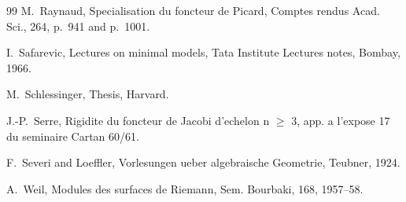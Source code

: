 \documentclass[10pt]{amsart}
\theoremstyle{plain}
\theoremstyle{definition}
\begin{document}
\begin{thebibliography}{99}
 M.~Raynaud, Specialisation du foncteur de Picard, Comptes rendus Acad. Sci., 264, p.~941 and p.~1001.

 I.~Safarevic, Lectures on minimal models, Tata Institute Lectures notes, Bombay, 1966.

 M.~Schlessinger, Thesis, Harvard.

 J.-P.~Serre, Rigidite du foncteur de Jacobi d'echelon n $\geq$ 3, app. a l'expose 17 du seminaire Cartan 60/61.

 F.~Severi and Loeffler, Vorlesungen ueber algebraische Geometrie, Teubner, 1924.

 A.~Weil, Modules des surfaces de Riemann, Sem. Bourbaki, 168, 1957--58.

\end{thebibliography}
\end{document}
